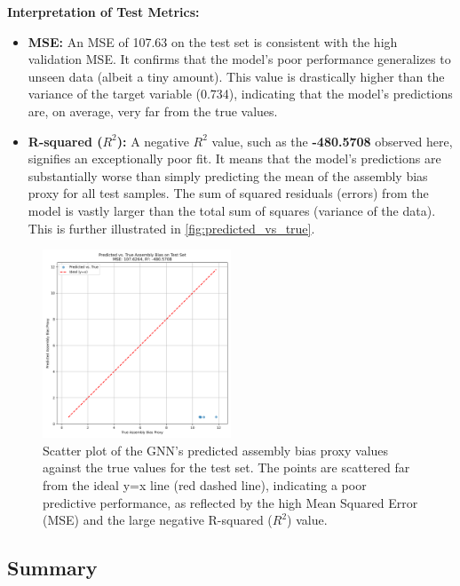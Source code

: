 \documentclass[twocolumn]{aastex631}
\begin{document}
\textbf{Interpretation of Test Metrics:}
\begin{itemize}
    \item \textbf{MSE:} An MSE of 107.63 on the test set is consistent with the high validation MSE. It confirms that the model's poor performance generalizes to unseen data (albeit a tiny amount). This value is drastically higher than the variance of the target variable (0.734), indicating that the model's predictions are, on average, very far from the true values.
    \item \textbf{R-squared ($R^2$):} A negative $R^2$ value, such as the \textbf{-480.5708} observed here, signifies an exceptionally poor fit. It means that the model's predictions are substantially worse than simply predicting the mean of the assembly bias proxy for all test samples. The sum of squared residuals (errors) from the model is vastly larger than the total sum of squares (variance of the data). This is further illustrated in \autoref{fig:predicted_vs_true}.
\end{itemize}

\begin{figure}[htbp]
    \centering
    \includegraphics[width=0.5\textwidth]{../input_files/plots/predicted_vs_true_bias_plot_2_1748137938.png}
    \caption{\label{fig:predicted_vs_true}Scatter plot of the GNN's predicted assembly bias proxy values against the true values for the test set. The points are scattered far from the ideal y=x line (red dashed line), indicating a poor predictive performance, as reflected by the high Mean Squared Error (MSE) and the large negative R-squared ($R^2$) value.}
\end{figure}

\subsection{Summary}
\end{document}

